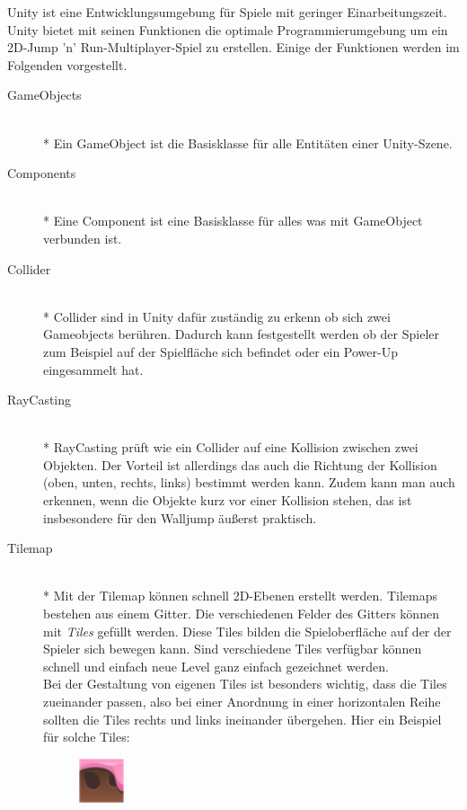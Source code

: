 Unity ist eine Entwicklungsumgebung für Spiele mit geringer Einarbeitungszeit. Unity bietet mit seinen Funktionen die optimale Programmierumgebung um ein 2D-Jump 'n' Run-Multiplayer-Spiel zu erstellen. Einige der Funktionen werden im Folgenden vorgestellt.

\begin{description}
    \item[GameObjects] \hfill \\* Ein GameObject ist die Basisklasse für alle Entitäten einer Unity-Szene.
    \item[Components] \hfill \\* Eine Component ist eine Basisklasse für alles was mit GameObject verbunden ist.
    \item[Collider] \hfill \\* Collider sind in Unity dafür zuständig zu erkenn ob sich zwei Gameobjects berühren. Dadurch kann festgestellt werden ob der Spieler zum Beispiel auf der Spielfläche sich befindet oder ein Power-Up eingesammelt hat.
    \item[RayCasting] \hfill \\*
        RayCasting prüft wie ein Collider auf eine Kollision zwischen zwei Objekten. Der Vorteil ist allerdings das auch die Richtung der Kollision (oben, unten, rechts, links) bestimmt werden kann. Zudem kann man auch erkennen, wenn die Objekte kurz vor einer Kollision stehen, das ist insbesondere für den Walljump äußerst praktisch.
    \item[Tilemap] \hfill \\* Mit der Tilemap können schnell 2D-Ebenen erstellt werden. Tilemaps bestehen aus einem Gitter. Die verschiedenen Felder des Gitters können mit \textit{Tiles} gefüllt werden. Diese Tiles bilden die Spieloberfläche auf der der Spieler sich bewegen kann. Sind verschiedene Tiles verfügbar können schnell und einfach neue Level ganz einfach gezeichnet werden. \\ 
        Bei der Gestaltung von eigenen Tiles ist besonders wichtig, dass die Tiles zueinander passen, also bei einer Anordnung in einer horizontalen Reihe sollten die Tiles rechts und links ineinander übergehen. Hier ein Beispiel für solche Tiles: 
        \begin{figure}[H]
            \begin{center}
              \includegraphics[width=50px]{img/realisierung/tile1.png}

\end{center}
\end{figure}
\end{description}
